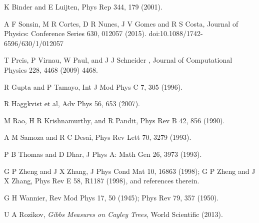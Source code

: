 \documentclass[a4,aps,amsmath,floatfix,nofootinbib,10pt]{revtex4}
\begin{document}
\begin{thebibliography}{99}
 K Binder and E Luijten, Phys Rep 344, 179 (2001).

 A F Sonsin, M R Cortes, D R Nunes, J V Gomes and R S 
Costa, Journal of Physics: Conference Series 630, 012057 (2015).
doi:10.1088/1742-6596/630/1/012057 

 T Preis, P Virnau, W Paul, and J J Schneider , Journal 
of Computational Physics 228, 4468 (2009) 4468.

 R Gupta and P Tamayo, Int J Mod Phys C 7, 305 (1996).

 R Haggkvist et al, Adv Phys 56, 653 (2007).

 M Rao, H R Krishnamurthy, and R Pandit, Phys Rev B 42, 
856 (1990).

 A M Samoza and R C Desai, Phys Rev Lett 70, 3279 (1993).

 P B Thomas and D Dhar, J Phys A: Math Gen 26, 3973 (1993).

 G P Zheng and J X Zhang, J Phys Cond Mat 10, 16863 
(1998); G P Zheng and J X Zhang, Phys Rev E 58, R1187 (1998), and 
references therein.

 G H Wannier, Rev Mod Phys 17, 50 (1945); Phys Rev 79, 
357 (1950).

 U A Rozikov, {\em{Gibbs Measures on Cayley Trees}}, 
World Scientific (2013). \end{thebibliography}
\end{document}
